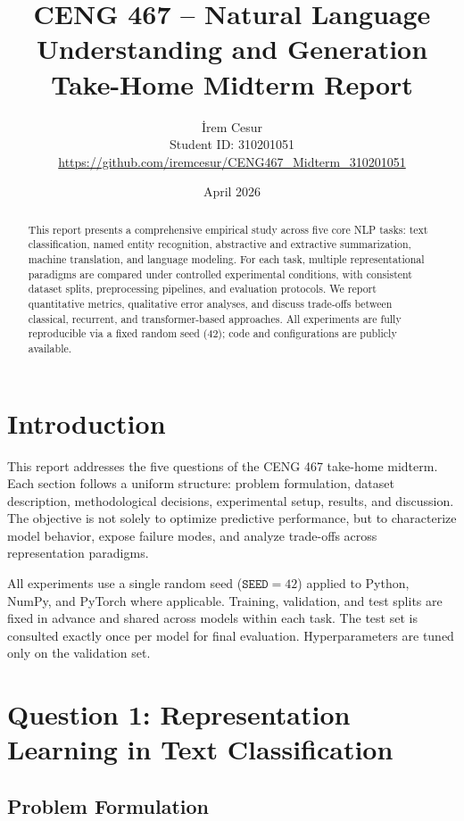 \documentclass[11pt,a4paper]{article}
\title{
    \vspace{-2cm}
    \large CENG 467 -- Natural Language Understanding and Generation \\
    \Large \textbf{Take-Home Midterm Report}
}
\author{
    İrem Cesur \\
    Student ID: 310201051 \\
    \href{https://github.com/iremcesur/CENG467_Midterm_310201051}{https://github.com/iremcesur/CENG467\_Midterm\_310201051}
}
\date{April 2026}
\begin{document}
\maketitle

\begin{abstract}
\noindent
This report presents a comprehensive empirical study across five core NLP tasks: text classification, named entity recognition, abstractive and extractive summarization, machine translation, and language modeling. For each task, multiple representational paradigms are compared under controlled experimental conditions, with consistent dataset splits, preprocessing pipelines, and evaluation protocols. We report quantitative metrics, qualitative error analyses, and discuss trade-offs between classical, recurrent, and transformer-based approaches. All experiments are fully reproducible via a fixed random seed (42); code and configurations are publicly available.
\end{abstract}

\tableofcontents
\newpage

\section{Introduction}
\label{sec:intro}

This report addresses the five questions of the CENG 467 take-home midterm. Each section follows a uniform structure: problem formulation, dataset description, methodological decisions, experimental setup, results, and discussion. The objective is not solely to optimize predictive performance, but to characterize model behavior, expose failure modes, and analyze trade-offs across representation paradigms.

All experiments use a single random seed ($\texttt{SEED}=42$) applied to Python, NumPy, and PyTorch where applicable. Training, validation, and test splits are fixed in advance and shared across models within each task. The test set is consulted exactly once per model for final evaluation. Hyperparameters are tuned only on the validation set.

\section{Question 1: Representation Learning in Text Classification}
\label{sec:q1}

\subsection{Problem Formulation}
\end{document}
